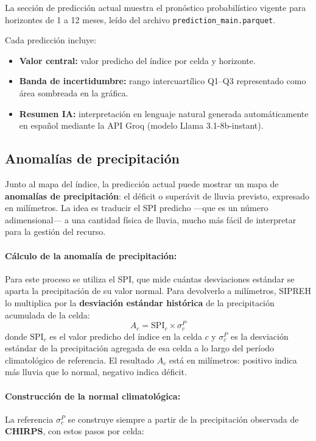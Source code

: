La sección de predicción actual muestra el pronóstico probabilístico vigente para horizontes de 1 a 12 meses, leído del archivo \texttt{prediction\_main.parquet}.

Cada predicción incluye:
\begin{itemize}
    \item \textbf{Valor central:} valor predicho del índice por celda y horizonte.
    \item \textbf{Banda de incertidumbre:} rango intercuartílico Q1--Q3 representado como área sombreada en la gráfica.
    \item \textbf{Resumen IA:} interpretación en lenguaje natural generada automáticamente en español mediante la API Groq (modelo Llama 3.1-8b-instant).
\end{itemize}

\subsection{Anomalías de precipitación}

Junto al mapa del índice, la predicción actual puede mostrar un mapa de \textbf{anomalías de precipitación}: el déficit o superávit de lluvia previsto, expresado en milímetros. La idea es traducir el SPI predicho ---que es un número adimensional--- a una cantidad física de lluvia, mucho más fácil de interpretar para la gestión del recurso.

\paragraph{Cálculo de la anomalía de precipitación:}Para este proceso se utiliza el SPI, que mide cuántas desviaciones estándar se aparta la precipitación de su valor normal. Para devolverlo a milímetros, SIPREH lo multiplica por la \textbf{desviación estándar histórica} de la precipitación acumulada de la celda:
\[
A_{c} = \mathrm{SPI}_{c} \times \sigma^{P}_{c}
\]
donde $\mathrm{SPI}_{c}$ es el valor predicho del índice en la celda $c$ y $\sigma^{P}_{c}$ es la desviación estándar de la precipitación agregada de esa celda a lo largo del período climatológico de referencia. El resultado $A_c$ está en milímetros: positivo indica más lluvia que lo normal, negativo indica déficit.

\paragraph{Construcción de la normal climatológica:}La referencia $\sigma^{P}_{c}$ se construye siempre a partir de la precipitación observada de \textbf{CHIRPS}, con estos pasos por celda:

